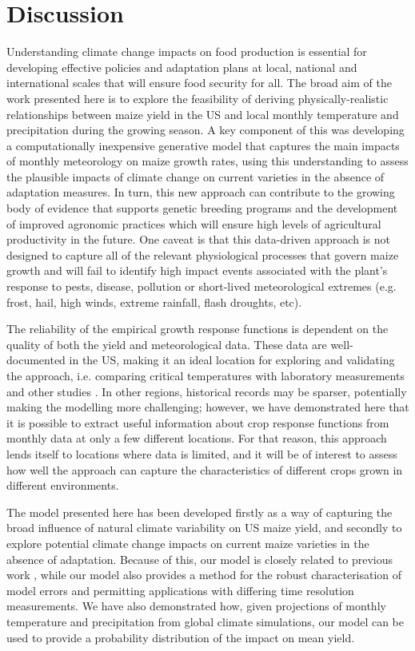 \documentclass[12pt]{article}
\begin{document}
\section{Discussion}
\label{sec:future}
Understanding climate change impacts on food production is essential for developing effective policies and adaptation plans at local, national and international scales that will ensure food security for all. The broad aim of the work presented here is to explore the feasibility of deriving physically-realistic relationships between maize yield in the US and local monthly temperature and precipitation during the growing season. A key component of this was developing a computationally inexpensive generative model that captures the main impacts of monthly meteorology on maize growth rates, using this understanding to assess the plausible impacts of climate change on current varieties in the absence of adaptation measures. In turn, this new approach can contribute to the growing body of evidence that supports genetic breeding programs and the development of improved agronomic practices which will ensure high levels of agricultural productivity in the future. One caveat is that this data-driven approach is not designed to capture all of the relevant physiological processes that govern maize growth and will fail to identify high impact events associated with the plant's response to pests, disease, pollution or short-lived meteorological extremes (e.g. frost, hail, high winds, extreme rainfall, flash droughts, etc).


The reliability of the empirical growth response functions is dependent on the quality of both the yield and meteorological data. These data are well-documented in the US, making it an ideal location for exploring and validating the approach, i.e. comparing critical temperatures with laboratory measurements and other studies \citep[e.g.][]{cutforth:1990, schlenker:2009, hatfield:2011, lobell:2013, sanchez:2014}. In other regions, historical records may be sparser, potentially making the modelling more challenging; however, we have demonstrated here that it is possible to extract useful information about crop response functions from monthly data at only a few different locations. For that reason, this approach lends itself to locations where data is limited, and it will be of interest to assess how well the approach can capture the characteristics of different crops grown in different environments.

 

The model presented here has been developed firstly as a way of capturing the broad influence of natural climate variability on US maize yield, and secondly to explore potential climate change impacts on current maize varieties in the absence of adaptation. Because of this, our model is closely related to previous work \citep[e.g.][]{schlenker:2009, roberts:2012, lobell:2013}, while our model also provides a method for the robust characterisation of model errors and permitting applications with differing time resolution measurements. We have also demonstrated how, given projections of monthly temperature and precipitation from global climate simulations, our model can be used to provide a probability distribution of the impact on mean yield.
\end{document}
